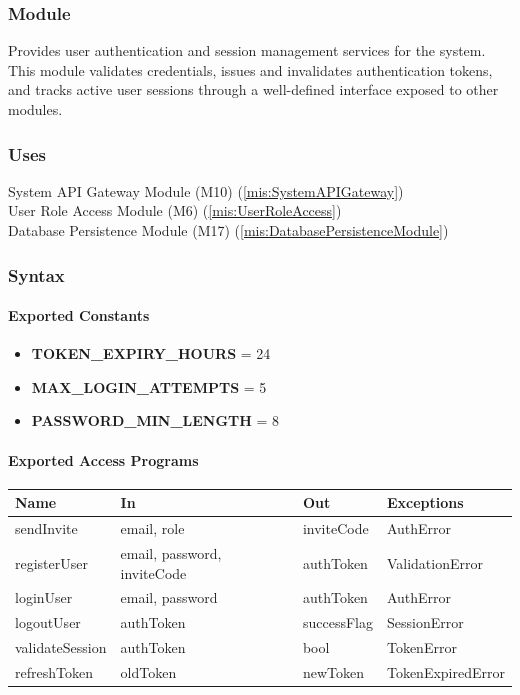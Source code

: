\documentclass[12pt, titlepage]{article}
\begin{document}
\subsubsection{Module}
Provides user authentication and session management services for the system.
This module validates credentials, issues and invalidates authentication tokens,
and tracks active user sessions through a well-defined interface exposed to
other modules.


\subsubsection{Uses}
System API Gateway Module (M10) (\ref{mis:SystemAPIGateway})\\
User Role Access Module (M6) (\ref{mis:UserRoleAccess})\\
Database Persistence Module (M17) (\ref{mis:DatabasePersistenceModule})\\

\subsubsection{Syntax}

\paragraph{Exported Constants}
\begin{itemize}
  \item \textbf{TOKEN\_EXPIRY\_HOURS} = 24
  \item \textbf{MAX\_LOGIN\_ATTEMPTS} = 5
  \item \textbf{PASSWORD\_MIN\_LENGTH} = 8
\end{itemize}

\paragraph{Exported Access Programs}
\begin{center}
\renewcommand{\arraystretch}{1.2}
\begin{tabularx}{\textwidth}{l X X l}
\toprule
\textbf{Name} & \textbf{In} & \textbf{Out} & \textbf{Exceptions}\\
\midrule
sendInvite & email, role & inviteCode & AuthError \\
registerUser & email, password, inviteCode & authToken & ValidationError \\
loginUser & email, password & authToken & AuthError \\
logoutUser & authToken & successFlag & SessionError \\
validateSession & authToken & bool & TokenError \\
refreshToken & oldToken & newToken & TokenExpiredError \\
\bottomrule
\end{tabularx}
\end{center}
\end{document}
